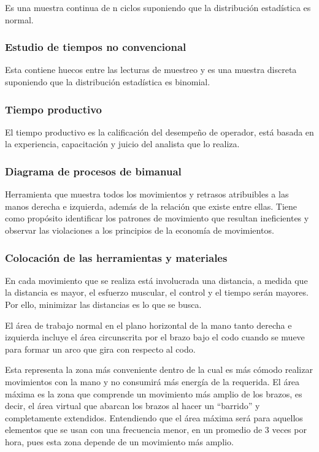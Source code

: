    Es una muestra continua de n ciclos suponiendo que la distribución estadística es normal.
    
    \subsubsection{Estudio de tiempos no convencional}
    
    Esta contiene huecos entre las lecturas de muestreo y es una muestra discreta suponiendo que la distribución estadística es binomial.
    
    \subsubsection{Tiempo productivo}
    
    El tiempo productivo es la calificación del desempeño de operador, está basada en la experiencia, capacitación y juicio del analista que lo realiza.
    
    \subsubsection{Diagrama de procesos de bimanual}
    
    Herramienta que muestra todos los movimientos y retrasos atribuibles a las manos derecha e izquierda, además de la relación que existe entre ellas. 
    Tiene como propósito identificar los patrones de movimiento que resultan ineficientes y observar las violaciones a los principios de la economía de movimientos.\cite{niebel1980ingenieria}
    
    \subsubsection{Colocación de las herramientas y materiales}
    
    En cada movimiento que se realiza está involucrada una distancia, a medida que la distancia es mayor, el esfuerzo muscular, el control y el tiempo serán mayores. Por ello, minimizar las distancias es lo que se busca.
    
    El área de trabajo normal en el plano horizontal de la mano tanto derecha e izquierda incluye el área circunscrita por el brazo bajo el codo cuando se mueve para formar un arco que gira con respecto al codo.
    
    Esta representa la zona más conveniente dentro de la cual es más cómodo realizar movimientos con la mano y no consumirá más energía de la requerida. El área máxima es la zona que  comprende un movimiento más amplio de los brazos, es decir, el área virtual que abarcan los brazos al hacer un “barrido” y completamente extendidos. Entendiendo que el área máxima será para aquellos elementos que se usan con una frecuencia menor, en un promedio de 3 veces por hora, pues esta zona depende de un movimiento más amplio. \cite{niebel1980ingenieria}
    
